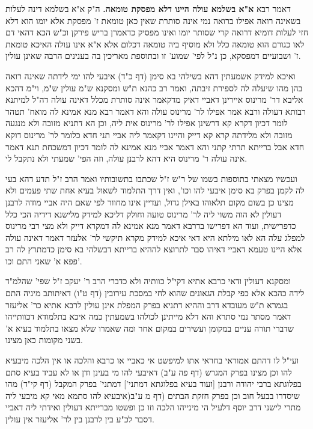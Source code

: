 \documentclass[12pt, openany]{book}
\begin{document}
{ דאמר רבא \textbf{א"א בשלמא עולה היינו דלא מפסקת טומאה.}  ה"ק א"א בשלמא דינה לעלות בשאינה רואה אפילו ברואה נמי אינה סותרת שאין כאן טומאת ז' מפסקת אלא יומו הוא דלא חזי לעלות דומיא דרואה קרי שסותר יומו ואינו מפסיק כדאמרן בריש פירקן וכ"ש הכא דהאי דם לאו כגורם הוא טומאה כלל ולא מוסיף ביה טומאה דכלום אלא א"א אינו עולה האיכא טומאת ז' ושבועיים דמפסקא, כן נ"ל לפי' שמוע' זו ובתוספת מאריכין בה בענינים הרבה שאינן עולין.\par  ואיכא למידק אשמעתין דהא בשילהי בא סימן (דף כ"ד) איבעי להו ימי לידתה שאינה רואה בהן מהו שיעלה לה לספירת זיבתה, ואמר רב כהנא ת"ש ומסקנא ש"מ עולין ש"מ, וי"מ דהכא אליבא דר' מרינוס איירינן דאביי דאיק מדקאמר אינה סותרת מכלל דאינה עולה דה"ל למיתנא רבותא דעולה ורבא אמר אפילו לר' מרינוס עולה והא דאמר רבא מנא אמינא לה מואח' תטהר לומר דכיון דקרא קא דרשינן אפילו לר' מרינוס אית ליה, וכן הא דתניא מזובה ולא מנגעה מזובה ולא מלידתה קרא קא דייק והיינו דקאמר ליה אביי תני חדא כלומר לר' מרינוס דוקא חדא אבל ברייתא תרתי קתני והא דאמר אביי מנא אמינא לה לומר דכיון דמשכחת תנא דאמר אינה עולה ר' מרינוס היא דהא לרבנן עולה, וזה הפי' שמעתי ולא נתקבל לי.\par ועכשיו מצאתי בתוספות בשמו של ר"ש ז"ל שכתבו בתשובותיו ואמר הרב ז"ל תדע דהא בעי לה לקמן בפרק בא סימן איבעי להו וכו', ואין דרך התלמוד לשאול בעיא אחת שתי פעמים ולא מצינו כן בשום מקום תלאוהו באילן גדול, ועדיין אינו מחוור לפי שאם היה אביי מודה לרבנן דעולין לא הוה משוי ליה לר' מרינוס טועה וחולק דליכא למידק מלישנא דידיה הכי כלל כדפרישית, ועוד הא דפרישו בדרבא דאמר מנא אמינא לה דמקרא דייק ולא מצי רבי מרינוס למפלג עלה הא לאו מילתא היא דאי איכא למידק מקרא תיקשי לר' אלעזר דאמר דאינה עולה אלא היינו טעמא דאביי דאיהו סבר לתרוצא לההיא ברייתא דבשלהי בא סימן כדמתרץ לה רב פפא א' שאני התם וכו'.\par  ומסקנא דעולין ודאי כרבא אתיא דקי"ל כוותיה ולא כדברי הרב ר' יעקב ז"ל שפי' שהלמ"ד לידה כהכא אלא כפי קבלת הגאונים שהוא לחי במסכת עירובין (דף ט"ו) דאיתותב מיניה התם בגמרא ת"ש מעובדא דרב וההיא דתניא בפרק המפלת אינן עולין לרבא אתיא כר' אליעזר דאמר מסתר נמי סתרא והא דלא מייתינן לכולהו בשמעתין כמה איכא בתלמודא דכוותייהו שדברי תורה עניים במקומן ועשירים במקום אחר ומה שאמרו שלא מצאו בתלמוד בעיא א' בשני מקומות כאן מצינו.\par  ועי"ל לו דהתם אמוראי בחראי אתו למיפשט אי כאביי או כרבא והלכה או אין הלכה מיבעיא להו וכן מצינו בפרק המגרש (דף פה ע"ב) דאיבעי להו מי בעינן ודן או לא עביד בעיא סתם בפלוגתא ברבי יהודה ורבנן [ועוד בעיא בפלוגתא דמתני'] דמתני' בפרק המקבל (דף קי"ד) מהו שיסדרו בבעל חוב וכן בפרק חזקת הבתים (דף מ ע"ב(איבעיא להו סתמא מאי קא מיבעי ליה מתרי לישני דרב יוסף דלעיל הי מינייהו הלכה וזו כן ופשטו מברייתא דעולין ואידתי ליה דאביי דסבר לכ"ע בין לרבנן בין לר' אליעזר אין עולין. 
\par}
\end{document}
